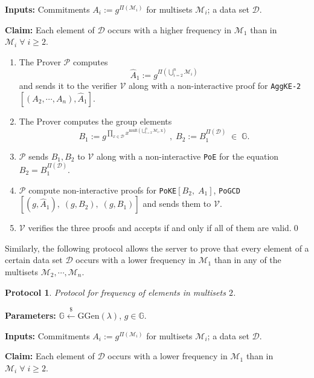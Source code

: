 \documentclass[11pt, lettersize, notitlepage, leqno, footskip=0.6cm]{article}
\newcommand{\pl}{\prod\limits}
\newcommand{\bG}{\mathbb{G}}
\newcommand{\mc}{\mathcal}
\newcommand{\mb}{\mathbb}
\newcommand{\mr}{\mathrm}
\newcommand{\lamb}{\lambda}
\newcommand{\what}{\widehat}
\newcommand{\mP}{\mc{P}}
\newcommand{\V}{\mc{V}}
\newcommand{\vs}{\vspace{-0.15cm}}
\newcommand{\noin}{\noindent}
\newtheorem{Prot}[Thm]{Protocol}
\numberwithin{equation}{section}
\begin{document}
\noin \textbf{Inputs:} Commitments $A_i := g^{\Pi(\mc{M}_i)}$ for multisets $\mc{M}_i$; a data set $\mc{D}$.

\noin \textbf{Claim:} Each element of $\mc{D}$ occurs with a higher frequency in $\mc{M}_1$ than in $\mc{M}_i\;\forall\;i\geq 2$.\vs

\begin{enumerate}[wide, labelwidth=!, labelindent=0pt] \vs

\item The Prover $\mP$ computes \vs $$\what{A}_1:= g^{\Pi\left(\bigcup\limits_{i=2}^n \mc{M}_i\right)} $$ and sends it to the verifier $\V$ along with a non-interactive proof for \verb|AggKE-2|$[(A_2,\cdots,A_n), \what{A}_1]$. \vs

\item The Prover computes the group elements \vs $$B_1:= g^{\pl_{x\in \mc{D}} x^{\mr{mult\left(\bigcup\limits_{i=2}^n \mc{M}_i, x\right)}}}\;,\;B_2:= B_1^{\Pi(\mc{D})} \;\in\; \bG.$$ \vspace{-0.8cm}

\item $\mP$ sends $B_1, B_2$ to $\V$ along with a non-interactive \verb|PoE| for the equation $B_2= B_1^{\Pi(\mc{D})}$. \vs

\item $\mP$ compute non-interactive proofs for \verb|PoKE|$[B_2,\;A_1]$, \verb|PoGCD|$[(g, \what{A}_1),\;(g, B_2),\;(g, B_1)]$ and sends them to $\V$.\vs

\item $\V$ verifies the three proofs and accepts if and only if all of them are valid.\qed\end{enumerate}

Similarly, the following protocol allows the server to prove that every element of a certain data set $\mc{D}$ occurs with a lower frequency in $\mc{M}_1$ than in any of the multisets $\mc{M}_2,\cdots,\mc{M}_n$.

\begin{Prot} Protocol for frequency of elements in multisets $2$.\end{Prot} \vspace{-0.3cm}

\noin \textbf{Parameters:} $\mb{G}\xleftarrow{\$} \mr{GGen}(\lamb)$,\; $g\in \mb{G}$.

\noin \textbf{Inputs:} Commitments $A_i := g^{\Pi(\mc{M}_i)}$ for multisets $\mc{M}_i$; a data set $\mc{D}$.

\noin \textbf{Claim:} Each element of $\mc{D}$ occurs with a lower frequency in $\mc{M}_1$ than in $\mc{M}_i\;\forall\;i\geq 2$. \vs
\end{document}
